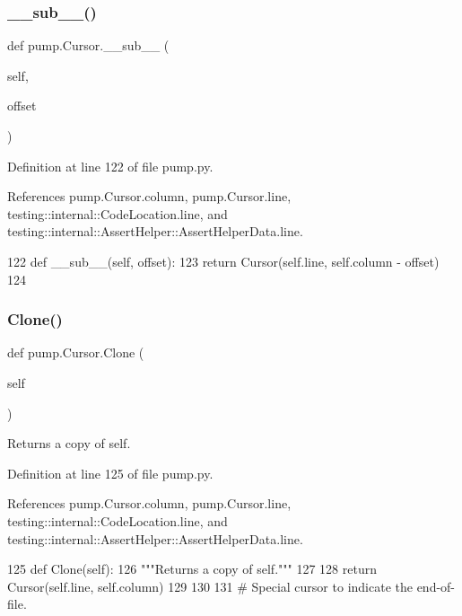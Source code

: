 \subsubsection{\texorpdfstring{\+\_\+\+\_\+sub\+\_\+\+\_\+()}{\_\_sub\_\_()}}
{\footnotesize\ttfamily def pump.\+Cursor.\+\_\+\+\_\+sub\+\_\+\+\_\+ (\begin{DoxyParamCaption}\item[{}]{self,  }\item[{}]{offset }\end{DoxyParamCaption})}



Definition at line 122 of file pump.\+py.



References pump.\+Cursor.\+column, pump.\+Cursor.\+line, testing\+::internal\+::\+Code\+Location.\+line, and testing\+::internal\+::\+Assert\+Helper\+::\+Assert\+Helper\+Data.\+line.


\begin{DoxyCode}
122   \textcolor{keyword}{def }\_\_sub\_\_(self, offset):
123     \textcolor{keywordflow}{return} Cursor(self.line, self.column - offset)
124 
\end{DoxyCode}
\mbox{\label{classpump_1_1Cursor_af68c9be83b0af87db441b21bc6ce8114}} 
\subsubsection{\texorpdfstring{Clone()}{Clone()}}
{\footnotesize\ttfamily def pump.\+Cursor.\+Clone (\begin{DoxyParamCaption}\item[{}]{self }\end{DoxyParamCaption})}

\begin{DoxyVerb}Returns a copy of self.\end{DoxyVerb}
 

Definition at line 125 of file pump.\+py.



References pump.\+Cursor.\+column, pump.\+Cursor.\+line, testing\+::internal\+::\+Code\+Location.\+line, and testing\+::internal\+::\+Assert\+Helper\+::\+Assert\+Helper\+Data.\+line.


\begin{DoxyCode}
125   \textcolor{keyword}{def }Clone(self):
126     \textcolor{stringliteral}{"""Returns a copy of self."""}
127 
128     \textcolor{keywordflow}{return} Cursor(self.line, self.column)
129 
130 
131 \textcolor{comment}{# Special cursor to indicate the end-of-file.}
\end{DoxyCode}


